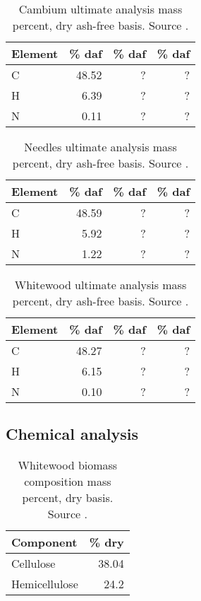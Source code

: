 \begin{table}[H]
    \centering
    \caption{Cambium ultimate analysis mass percent, dry ash-free basis. Source \cite{Unknown-2019}.}
    \begin{tabular}{lrrr}
        \toprule
        Element & \% daf & \% daf & \% daf \\
        \midrule
        C        & 48.52 & ? & ? \\
        H        & 6.39  & ? & ? \\
        N        & 0.11  & ? & ? \\
        \bottomrule
    \end{tabular}
\end{table}

\begin{table}[H]
    \centering
    \caption{Needles ultimate analysis mass percent, dry ash-free basis. Source \cite{Unknown-2019}.}
    \begin{tabular}{lrrr}
        \toprule
        Element & \% daf & \% daf & \% daf \\
        \midrule
        C        & 48.59 & ? & ? \\
        H        & 5.92  & ? & ? \\
        N        & 1.22  & ? & ? \\
        \bottomrule
    \end{tabular}
\end{table}

\begin{table}[H]
    \centering
    \caption{Whitewood ultimate analysis mass percent, dry ash-free basis. Source \cite{Unknown-2019}.}
    \begin{tabular}{lrrr}
        \toprule
        Element & \% daf & \% daf & \% daf \\
        \midrule
        C        & 48.27 & ? & ? \\
        H        & 6.15  & ? & ? \\
        N        & 0.10  & ? & ? \\
        \bottomrule
    \end{tabular}
\end{table}

\subsection{Chemical analysis}

\begin{table}[H]
    \centering
    \caption{Whitewood biomass composition mass percent, dry basis. Source \cite{Unknown-2020}.}
    \begin{tabular}{lr}
        \toprule
        Component & \% dry \\
        \midrule
        Cellulose       & 38.04 \\
        Hemicellulose   & 24.2  \\
        \bottomrule
    \end{tabular}
\end{table}
